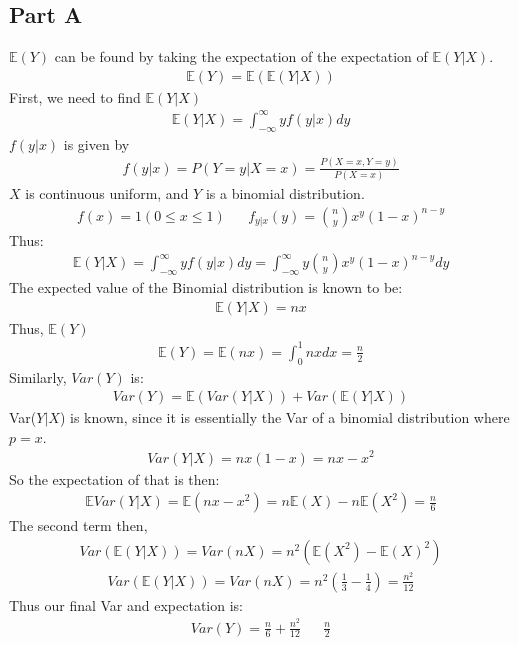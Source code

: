 \documentclass{article}
\begin{document}
\subsection*{Part A}
$\mathbb{E}(Y)$ can be found by taking the expectation of the expectation of $\mathbb{E}(Y|X)$.
\begin{align*}
\mathbb{E}(Y) = \mathbb{E}(\mathbb{E}(Y|X))
\end{align*}
First, we need to find $\mathbb{E}(Y|X)$
\begin{align*}
\mathbb{E}(Y|X) = \int_{-\infty}^{\infty} y f(y|x) dy
\end{align*}
$f(y|x)$ is given by
\begin{align*}
f(y|x) = P(Y=y|X=x) = \frac{P(X=x, Y=y)}{P(X=x)}
\end{align*}
$X$ is continuous uniform, and $Y$ is a binomial distribution.
\begin{align*}
f(x) = 1 (0 \leq x \leq 1) && f_{y|x}(y) = \binom{n}{y} x^y (1-x)^{n-y}
\end{align*}
Thus:
\begin{align*}
\mathbb{E}(Y|X) = \int_{-\infty}^{\infty} y f(y|x) dy = \int_{-\infty}^{\infty} y \binom{n}{y} x^y (1-x)^{n-y} dy
\end{align*}
The expected value of the Binomial distribution is known to be:
\begin{align*}
\mathbb{E}(Y|X) = nx
\end{align*}
Thus, $\mathbb{E}(Y)$
\begin{align*}
\mathbb{E}(Y) = \mathbb{E}(nx) = \int_{0}^{1} n x dx = \frac{n}{2}
\end{align*}
Similarly, $Var(Y)$ is:
\begin{align*}
Var(Y) = \mathbb{E}(Var(Y|X)) + Var(\mathbb{E}(Y|X))
\end{align*}
Var($Y|X$) is known, since it is essentially the Var of a binomial distribution where $p = x$.
\begin{align*}
Var(Y|X) = n x (1-x) = n x-x^2
\end{align*}
So the expectation of that is then:
\begin{align*}
\mathbb{E}Var(Y|X) = \mathbb{E}(n x-x^2) = n \mathbb{E}(X) - n \mathbb{E}(X^2) = \frac{n}{6}
\end{align*}
The second term then, 
\begin{align*}
Var(\mathbb{E}(Y|X)) = Var(nX) = n^2 (\mathbb{E}(X^2) - \mathbb{E}(X)^2)
\end{align*}
\begin{align*}
Var(\mathbb{E}(Y|X)) = Var(nX) = n^2 (\frac{1}{3} - \frac{1}{4}) = \frac{n^2}{12}
\end{align*}
Thus our final Var and expectation is:
\begin{align*}
\boxed{Var(Y) = \frac{n}{6} + \frac{n^2}{12} } && \boxed{ \frac{n}{2} }
\end{align*}
\end{document}
